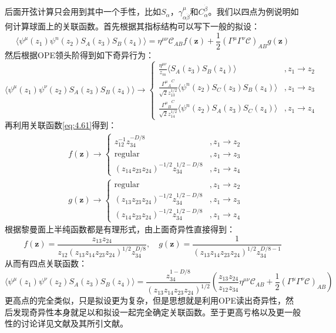 后面开弦计算只会用到其中一个手性，比如$S_\alpha$，$\gamma^\mu_{\alpha\dot\beta}$和$C_{\alpha}^{\dot\beta}$。我们以四点为例说明如何计算球面上的关联函数。首先根据其指标结构可以写下一般的拟设：
\begin{equation}
	\langle\psi^\mu(z_1)\psi^n(z_2)S_A(z_3)S_B(z_4)\rangle=\eta^{\mu\nu}\mathcal{C}_{AB}f(\mathbf{z})+\frac{1}{2}(\Gamma^\mu\Gamma^\nu\mathcal{C})_{AB}g(\mathbf{z})
\end{equation}
然后根据OPE领头阶得到如下奇异行为：
\begin{equation}
	\langle\psi^\mu(z_1)\psi^\nu(z_2)S_A(z_3)S_B(z_4)\rangle\to
	\begin{cases}\frac{\eta^{\mu\nu}}{z_m}\langle S_A(z_3)S_B(z_4)\rangle&, z_1\to z_2\\\frac{{{\Gamma^{\mu}}_A}^C}{\sqrt{2}z_{13}^{1/2}}\langle\psi^n(z_2)S_C(z_3)S_B(z_4)\rangle&, z_1\to z_3\\\frac{{{\Gamma^{\mu}}_B}^C}{\sqrt{2}z_{14}^{1/2}}\langle\psi^n(z_2)S_A(z_3)S_C(z_4)\rangle&, z_1\to z_4
	\end{cases}
\end{equation}
再利用关联函数\ref{eq:4.61}得到：
\begin{equation}
	\begin{aligned}
		&f(\mathbf{z})\to\begin{cases}z_{12}^{-1}z_{34}^{-D/8}&,z_1\to z_2\\\mathrm{regular}&,z_1\to z_3\\(z_{14}z_{23}z_{24})^{-1/2}z_{34}^{1/2-D/8}&,z_1\to z_4\end{cases}\\
		&g(\mathbf{z})\to\begin{cases}\mathrm{regular}&,z_1\to z_2\\(z_{13}z_{23}z_{24})^{-1/2}z_{34}^{1/2-D/8}&,z_1\to z_3\\(z_{14}z_{23}z_{24})^{-1/2}z_{34}^{1/2-D/8}&,z_1\to z_4\end{cases}
	\end{aligned}
\end{equation}
根据黎曼面上半纯函数都是有理形式，由上面奇异性直接得到：
\begin{equation}
	f(\mathbf{z})=\frac{z_{13}z_{24}}{z_{12}(z_{13}z_{14}z_{23}z_{24})^{1/2}z_{34}^{D/8}},\quad g(\mathbf{z})=\frac{1}{(z_{13}z_{14}z_{23}z_{24})^{1/2}z_{34}^{D/8-1}}
\end{equation}
从而有四点关联函数：
\begin{equation}
	\langle\psi^\mu(z_1)\psi^\nu(z_2)S_A(z_3)S_B(z_4)\rangle=\frac{z_{34}^{1-D/8}}{(z_{13}z_{14}z_{23}z_{24})^{1/2}}\left(\frac{z_{13}z_{24}}{z_{12}z_{34}}\eta^{\mu\nu}\mathcal{C}_{AB}+\frac{1}{2}(\Gamma^\mu\Gamma^\nu\mathcal{C})_{AB}\right)
\end{equation}
更高点的完全类似，只是拟设更为复杂，但是思想就是利用OPE读出奇异性，然后发现奇异性本身就足以和拟设一起完全确定关联函数。至于更高亏格以及更一般性的讨论详见文献\cite{Schlotterer:2012zz}及其所引文献。
